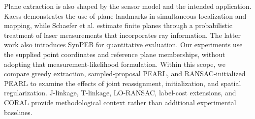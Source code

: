 Plane extraction is also shaped by the sensor model and the intended application. Kaess \cite{kaess2015planes} demonstrates the use of plane landmarks in simultaneous localization and mapping, while Schaefer et al. \cite{schaefer2019planes} estimate finite planes through a probabilistic treatment of laser measurements that incorporates ray information. The latter work also introduces SynPEB for quantitative evaluation. Our experiments use the supplied point coordinates and reference plane memberships, without adopting that measurement-likelihood formulation. Within this scope, we compare greedy extraction, sampled-proposal PEARL, and RANSAC-initialized PEARL to examine the effects of joint reassignment, initialization, and spatial regularization. J-linkage, T-linkage, LO-RANSAC, label-cost extensions, and CORAL provide methodological context rather than additional experimental baselines.
